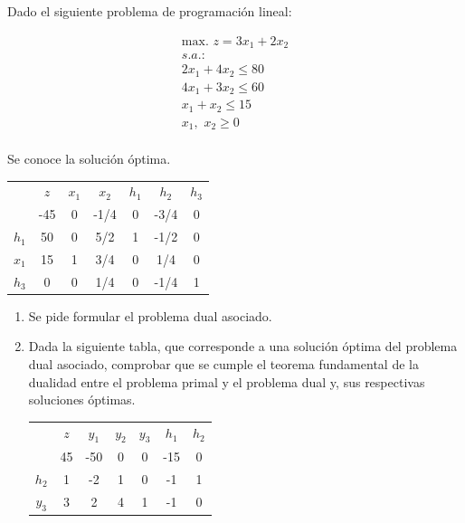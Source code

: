 
Dado el siguiente problema de programación lineal:

\begin{equation}
\begin{split}
\mbox{max. } z = 3x_1 + 2x_2\\
s.a.:\\
2x_1 + 4x_2 \leq 80\\
4x_1 + 3x_2 \leq 60\\
 x_1 +  x_2 \leq 15\\
x_1,\,\,x_2\geq 0\\
\end{split}
\end{equation}

Se conoce la solución óptima.

\begin{center}
\begin{tabular}{c|c|ccccc|}
 & $z$ & $x_1$ & $x_2$ & $h_1$ & $h_2$ & $h_3$\\ 
 & -45 & 0 & -1/4 & 0 & -3/4 & 0 \\ 
\hline
$h_1$ & 50  & 0 & 5/2 & 1 & -1/2 & 0\\ 
$x_1$ & 15  & 1 & 3/4 & 0 & 1/4 & 0\\ 
$h_3$ & 0  & 0 & 1/4 & 0 & -1/4 & 1\\ 
\hline
\end{tabular}
\end{center}



\begin{enumerate}
    \item Se pide formular el problema dual asociado.

\item Dada la siguiente tabla, que corresponde a una solución óptima del problema dual asociado, comprobar que se cumple el teorema fundamental de la dualidad entre el problema primal y el problema dual y, sus respectivas soluciones óptimas. 

\begin{center}
\begin{tabular}{c|c|ccccc|}
 & $z$ & $y_1$ & $y_2$ & $y_3$ & $h_1$ & $h_2$\\ 
 & 45 & -50 & 0 & 0 & -15 & 0 \\ 
\hline
$h_2$ & 1  & -2 & 1 & 0 & -1 & 1\\ 
$y_3$ & 3  & 2 & 4 & 1 & -1 & 0\\ 
\hline
\end{tabular}
\end{center}

\end{enumerate}     